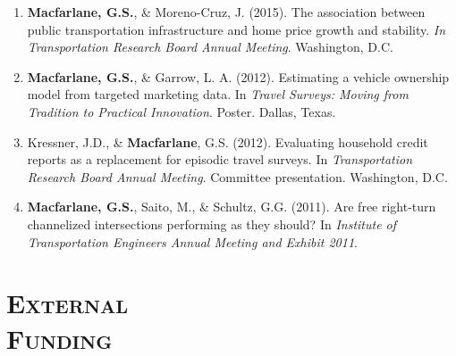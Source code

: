 \documentclass[margin,line]{res}
\newcounter{enuminitialize}
\newenvironment{myenum}[1][]
{%
 \setcounter{enuminitialize}{#1}
 \addtocounter{enuminitialize}{2}
 \begin{enumerate}[left= 4pt, itemsep=12pt, start=\value{enuminitialize}, label=\arabic*\addtocounter{enumi}{-2}]
}
{%
 \end{enumerate}
}
\newcommand{\secfont}{\scshape }
\begin{document}
\begin{resume}
\begin{myenum}[20]
\item \textbf{Macfarlane, G.S.}, \& Moreno-Cruz, J. (2015). The association between public transportation infrastructure and home price growth and stability. \textit{ In Transportation Research Board Annual Meeting}. Washington, D.C.
\item \textbf{Macfarlane, G.S.}, \& Garrow, L. A. (2012). Estimating a vehicle ownership model from targeted marketing data. In \textit{ Travel Surveys: Moving from Tradition to Practical Innovation}. Poster. Dallas, Texas.
\item Kressner, J.D., \& \textbf{Macfarlane}, G.S. (2012). Evaluating household credit reports as a replacement for episodic travel surveys. In \textit{ Transportation Research Board Annual Meeting}. Committee presentation. Washington, D.C.
\item \textbf{Macfarlane, G.S.}, Saito, M., \& Schultz, G.G. (2011). Are free right-turn channelized intersections performing as they should? In \textit{ Institute of Transportation Engineers Annual Meeting and Exhibit 2011}.
\end{myenum}



\noindent\makebox[\linewidth]{\rule{\linewidth}{0.4pt}}
\section{\secfont External \\Funding}


\end{resume}
\end{document}
